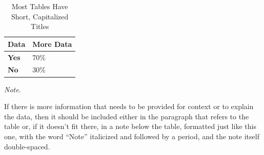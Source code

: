 \vspace{2\baselineskip}
\begin{table}[ht!]
\caption{Most Tables Have Short, Capitalized Titles}

\begin{tabular}{|L{0.4\textwidth}|L{0.4\textwidth}|}
\hline
Data         & \textbf{More Data} \\ \hline
\textbf{Yes} & 70\%               \\ \hline
\textbf{No}  & 30\%               \\ \hline
\end{tabular}


\medskip
\small\textit{Note}. 
\begin{doublespace}
If there is more information that needs to be provided for context or to explain the data, then it should be included either in the paragraph that refers to the table or, if it doesn’t fit there, in a note below the table, formatted just like this one, with the word “Note” italicized and followed by a period, and the note itself double-spaced.
\end{doublespace}
\end{table}
\FloatBarrier
\vspace{\baselineskip}

\lipsum[2]

